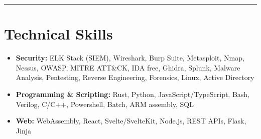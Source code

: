 \documentclass[a4paper,10pt]{article}
\begin{document}
\vspace{5pt}\hrule

\section*{Technical Skills}
\vspace{-8pt}
\begin{itemize}
    \item \textbf{Security:} ELK Stack (SIEM), Wireshark, Burp Suite, Metasploit, Nmap, Nessus, OWASP, MITRE ATT\&CK, IDA free, Ghidra, Splunk, Malware Analysis, Pentesting, Reverse Engineering, Forensics, Linux, Active Directory
    \item \textbf{Programming \& Scripting:} Rust, Python, JavaScript/TypeScript, Bash, Verilog, C/C++, Powershell, Batch, ARM assembly, SQL
    \item \textbf{Web:} WebAssembly, React, Svelte/SvelteKit, Node.js, REST APIs, Flask, Jinja
\end{itemize}
\end{document}
